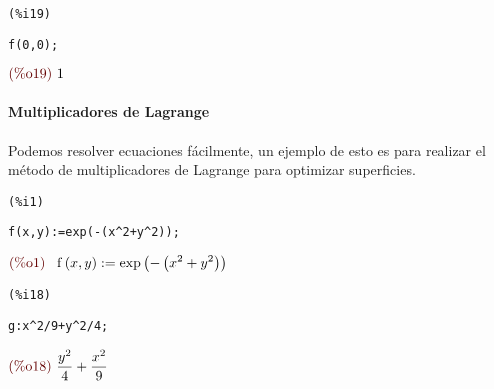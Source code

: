 \documentclass[12pt]{article}
\begin{document}
\noindent
\begin{minipage}[t]{8ex}{\color{red}\bf
\begin{verbatim}
(%i19) 
\end{verbatim}}
\end{minipage}
\begin{minipage}[t]{\textwidth}{\color{blue}
\begin{verbatim}
f(0,0);
\end{verbatim}}
\end{minipage}
\begin{math}\displaystyle
\parbox{8ex}{\color{labelcolor}(\%o19) }
1
\end{math}


\paragraph{Multiplicadores de Lagrange} Podemos resolver ecuaciones fácilmente, un ejemplo de esto es para realizar el método de multiplicadores de Lagrange para optimizar superficies.

\noindent
\begin{minipage}[t]{8ex}{\color{red}\bf
\begin{verbatim}
(%i1) 
\end{verbatim}}
\end{minipage}
\begin{minipage}[t]{\textwidth}{\color{blue}
\begin{verbatim}
f(x,y):=exp(-(x^2+y^2));
\end{verbatim}}
\end{minipage}
\begin{math}\displaystyle
\parbox{8ex}{\color{labelcolor}(\%o1) }
\mathrm{f}\left( x,y\right) :=\mathrm{exp}\left( -\left( {x}^{2}+{y}^{2}\right) \right) 
\end{math}


\noindent
\begin{minipage}[t]{8ex}{\color{red}\bf
\begin{verbatim}
(%i18) 
\end{verbatim}}
\end{minipage}
\begin{minipage}[t]{\textwidth}{\color{blue}
\begin{verbatim}
g:x^2/9+y^2/4;
\end{verbatim}}
\end{minipage}
\begin{math}\displaystyle
\parbox{8ex}{\color{labelcolor}(\%o18) }
\frac{{y}^{2}}{4}+\frac{{x}^{2}}{9}
\end{math}
\end{document}
